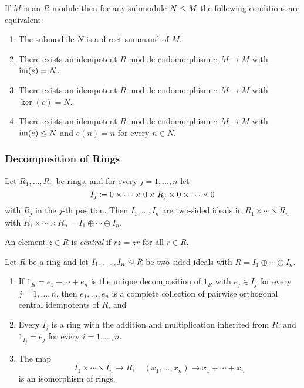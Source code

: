 \begin{corollary}
  If $M$ is an $R$-module then for any submodule $N \leq M$ the following conditions are equivalent:
  \begin{enumerate}
    \item
      The submodule $N$ is a direct summand of $M$.
    \item
      There exists an idempotent $R$-module endomorphism $e \colon M \to M$ with $\operatorname{im}(e) = N$.
    \item
      There exists an idempotent $R$-module endomorphism $e \colon M \to M$ with $\ker(e) = N$.
    \item
      There exists an idempotent $R$-module endomorphism $e \colon M \to M$ with $\operatorname{im}(e) \leq N$ and $e(n) = n$ for every $n \in N$.
  \end{enumerate}
\end{corollary}



\subsubsection{Decomposition of Rings}


\begin{lemma}
  Let $R_1, \dotsc, R_n$ be rings, and for every $j = 1, \dotsc, n$ let
  \[
              I_j
    \coloneqq  0 \times \dotsb \times 0 \times R_j \times 0 \times \dotsb \times 0
  \]
  with $R_j$ in the $j$-th position.
  Then $I_1, \dotsc, I_n$ are two-sided ideals in $R_1 \times \dotsb \times R_n$ with $R_1 \times \dotsb \times R_n = I_1 \oplus \dotsb \oplus I_n$.
\end{lemma}


\begin{definition}
  An element $z \in R$ is \emph{central} if $rz = zr$ for all $r \in R$.
\end{definition}


\begin{proposition}
  \label{proposition: factor ideals are again rings}
  Let $R$ be a ring and let $I_1, \dotsc, I_n \trianglelefteq R$ be two-sided ideals with $R = I_1 \oplus \dotsb \oplus I_n$.
  \begin{enumerate}
    \item
      If $1_R = e_1 + \dotsb + e_n$ is the unique decomposition of $1_R$ with $e_j \in I_j$ for every $j = 1, \dotsc, n$, then $e_1, \dotsc, e_n$ is a complete collection of pairwise orthogonal central idempotents of $R$, and 
    \item
      Every $I_j$ is a ring with the addition and multiplication inherited from $R$, and $1_{I_j} = e_j$ for every $i = 1, \dotsc, n$.
    \item
      The map
      \[
            I_1 \times \dotsb \times I_n
        \to R,
        \quad   (x_1, \dotsc, x_n)
        \mapsto x_1 + \dotsb + x_n
      \]
      is an isomorphism of rings.
  \end{enumerate}
\end{proposition}


